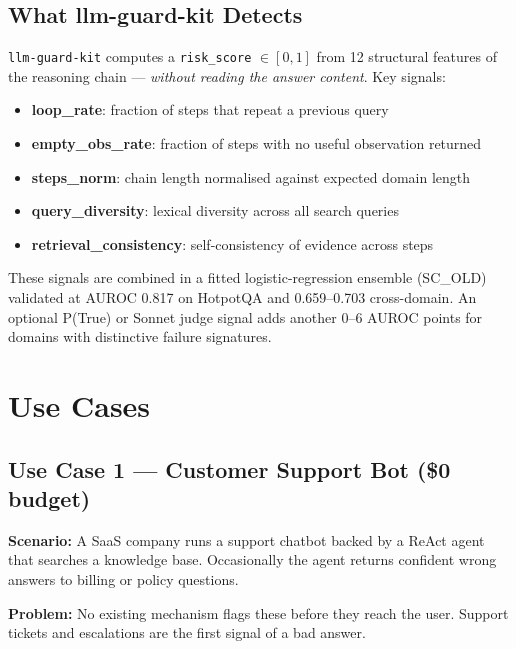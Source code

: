\documentclass[11pt,a4paper]{article}
\begin{document}
\subsection*{What llm-guard-kit Detects}

\texttt{llm-guard-kit} computes a \texttt{risk\_score} $\in [0,1]$ from 12 structural
features of the reasoning chain --- \emph{without reading the answer content}.
Key signals:

\begin{itemize}
  \item \textbf{loop\_rate}: fraction of steps that repeat a previous query
  \item \textbf{empty\_obs\_rate}: fraction of steps with no useful observation returned
  \item \textbf{steps\_norm}: chain length normalised against expected domain length
  \item \textbf{query\_diversity}: lexical diversity across all search queries
  \item \textbf{retrieval\_consistency}: self-consistency of evidence across steps
\end{itemize}

These signals are combined in a fitted logistic-regression ensemble (SC\_OLD)
validated at AUROC 0.817 on HotpotQA and 0.659--0.703 cross-domain.
An optional P(True) or Sonnet judge signal adds another 0--6 AUROC points
for domains with distinctive failure signatures.

\section{Use Cases}

\subsection{Use Case 1 --- Customer Support Bot (\$0 budget)}

\textbf{Scenario:} A SaaS company runs a support chatbot backed by a ReAct
agent that searches a knowledge base. Occasionally the agent returns confident
wrong answers to billing or policy questions.

\textbf{Problem:} No existing mechanism flags these before they reach the user.
Support tickets and escalations are the first signal of a bad answer.
\end{document}
